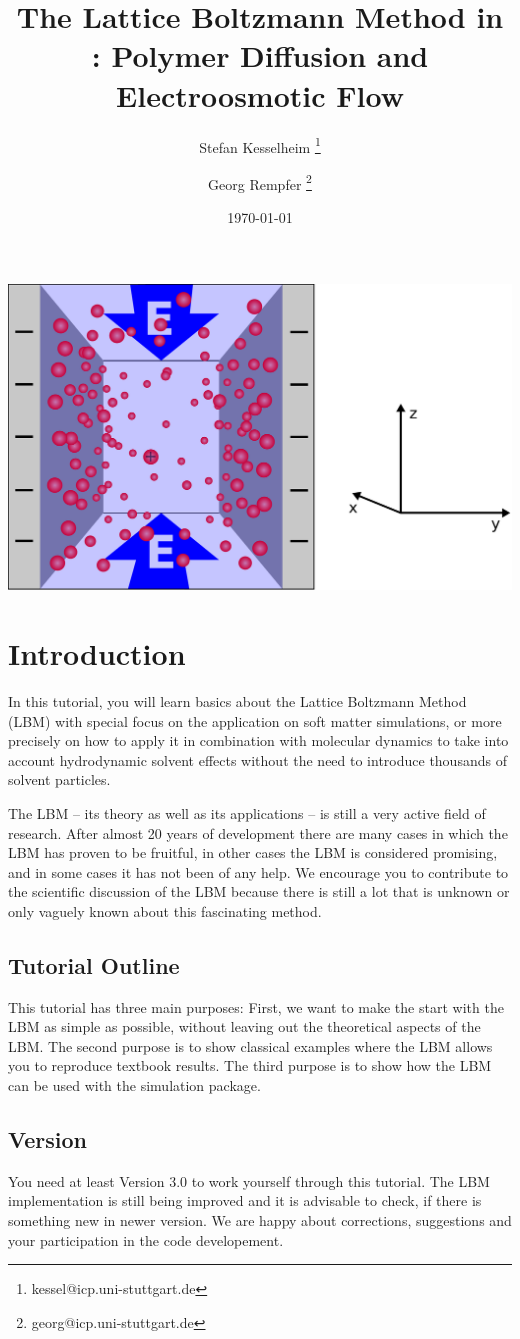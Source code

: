 \renewcommand{\d}{\mathrm d}
\subject{ESPResSo Tutorial}
\title{The Lattice Boltzmann Method in \ES{}: 
Polymer Diffusion and Electroosmotic Flow
} \author{ Stefan Kesselheim \thanks{\ttfamily 
kessel@icp.uni-stuttgart.de}  \and  Georg Rempfer \thanks{\ttfamily 
georg@icp.uni-stuttgart.de}}
\date{\today}
\publishers{Institute for Computational Physics, Stuttgart University}
\maketitle 
\begin{center}
  \includegraphics[width=0.5\columnwidth]{../figs/schlitzpore_3d.pdf}
\end{center}
\tableofcontents



 \chapter{Introduction}
In this tutorial, you will learn basics about the 
Lattice Boltzmann Method (LBM) with special focus on the application
on soft matter simulations, or more precisely on how to apply it 
in combination with molecular dynamics to take into account 
hydrodynamic solvent effects without the need to introduce
thousands of solvent particles. 

The LBM -- its theory as well as its applications -- is 
still a very active field of research. After almost 20 years
of development there are many cases in which the LBM has proven
to be fruitful, in other cases the LBM is considered promising,
and in some cases it has not been of any help. We
encourage you to contribute to the scientific discussion 
of the LBM because there is still a lot 
that is unknown or only vaguely known about this fascinating
method. 

\section*{Tutorial Outline}
This tutorial has three main purposes: First, we want to make the start
with the LBM as simple as possible, without leaving out the theoretical
aspects of the LBM.
The second purpose is to show classical examples where the LBM allows 
you to reproduce textbook results.
The third purpose is to show how the LBM can be used with the
\ES{} simulation package. 

\section*{\ES{} Version}
You need at least \ES{} Version 3.0 to work yourself through this 
tutorial. The LBM implementation is still being improved and it is advisable
to check, if there is something new in newer version. We are happy 
about corrections, suggestions and your participation in the code developement.
